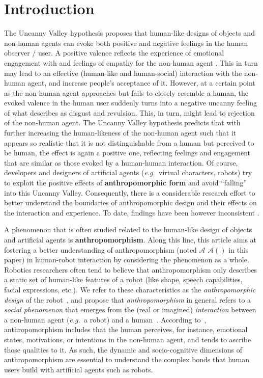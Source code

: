 \documentclass{frontiersSCNS} %
\newcommand{\eg}{{\textit{e.g.~}}}
\newcommand{\Ant}[1][]{%
      \ifthenelse{\isempty{#1}}%
        {$\mathcal{A}$}
        {$\mathcal{A}(#1)$}
}
\begin{document}
\section{Introduction}
\label{sec:intro}

The Uncanny Valley hypothesis \citep{mori_uncanny_1970} proposes that human-like
designs of objects and non-human agents can evoke both positive and negative feelings in the human observer / user. A positive valence reflects the experience of 
emotional engagement with and feelings of empathy for the non-human agent
\citep{cheetham_human_2011}. This in turn may lead to an effective (human-like and 
human-social) interaction with the non-human agent, and increase people's acceptance of
it. 
However, at a certain point as the non-human agent
approaches but fails to closely resemble a human, the evoked valence in the
human user suddenly turns into a negative uncanny feeling of what
\cite{mori_uncanny_1970} describes as disgust and revulsion. This, in turn,
might lead to rejection of the non-human agent. The Uncanny
Valley hypothesis predicts that with further increasing the human-likeness of
the non-human agent such that it appears so realistic that it is not
distinguishable from a human but perceived to be human, the effect is again a
positive one, reflecting feelings and engagement that are similar as those
evoked by a human-human interaction. 
Of course, developers and designers of artificial agents
(\eg virtual characters, robots) try to exploit the positive effects of 
\textbf{anthropomorphic form} and avoid ``falling'' into this Uncanny Valley.
Consequently, there is a considerable research effort to
better understand the boundaries of anthropomorphic design and their effects
on the interaction and experience. To date, findings have been however
inconsistent \citep{cheetham_human_2011}.

A phenomenon that is often studied related to the human-like design of objects and 
artificial agents is \textbf{anthropomorphism}.
Along this line, this article aims at fostering a better understanding of
anthropomorphism (noted \Ant in this paper) in human-robot interaction 
by considering the phenomenon
as a whole. Robotics researchers often tend to believe that
anthropomorphism only describes a static set of human-like features of a robot
(like shape, speech capabilities, facial expressions, etc.). We refer to these
characteristics as the \emph{anthropomorphic design} of the
robot~\citep{fink_anthropomorphism_2012}, and propose that \emph{anthropomorphism} in 
general refers to a \emph{social phenomenon} that emerges from the (real or
imagined) \emph{interaction} between a non-human agent (\eg a robot) and a 
human~\citep{persson_anthropomorphism_2000}. According to~\cite{epley_when_2008},
anthropomorphism includes that the human perceives, for instance, emotional states, motivations, or 
intentions in the non-human agent, and tends to ascribe those qualities to it.
As such, the dynamic and
socio-cognitive dimensions of anthropomorphism are essential to understand the
complex bonds that human users build with artificial agents such as robots.
\end{document}
